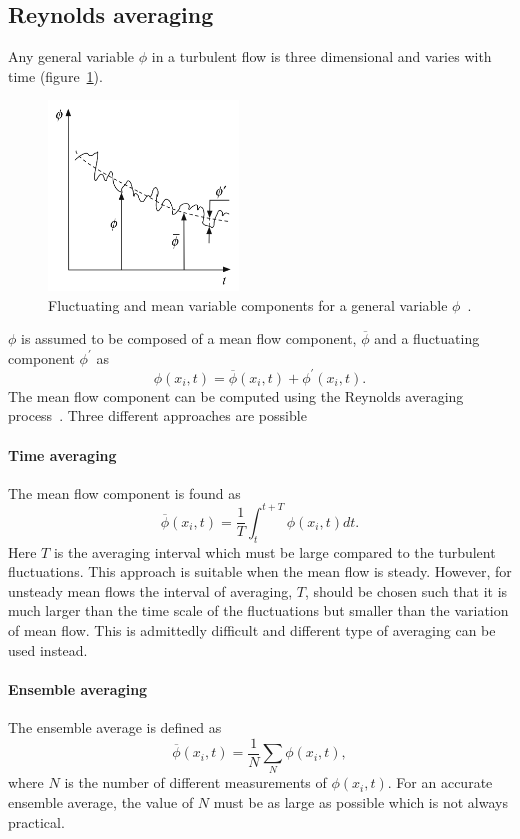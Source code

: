 \subsection{Reynolds averaging}\label{ssec:rans}
Any general variable $\phi$ in a turbulent flow is three dimensional and varies with time (figure~\ref{fig:ransfluct}). 
\begin{figure}[h]
\centering
\captionsetup{justification=centering}
 \includegraphics[width=0.45\textwidth]{ch2_litsurvey/Figures/RANSfluctphi.png}
\caption{Fluctuating and mean variable components for a general variable $\phi$~\cite{Moukalled}.}
 \label{fig:ransfluct}
\end{figure}
$\phi$ is assumed to be composed of a mean flow component, $\overline{\phi}$ and a fluctuating component $\phi^{\prime}$ as 
\begin{equation}
\phi(x_i,t) = \overline{\phi}(x_i,t) + \phi^{\prime}(x_i,t).
\end{equation}
The mean flow component can be computed using the Reynolds averaging process~\cite{Moukalled}. Three different approaches are possible
\paragraph{Time averaging}
The mean flow component is found as 
\begin{equation}
\overline{\phi}(x_i,t) = \frac{1}{T}\int_t^{t+T} \phi(x_i,t) dt.
\end{equation}
Here $T$ is the averaging interval which must be large compared to the turbulent fluctuations. This approach is suitable when the mean flow is steady. However, for unsteady mean flows the interval of averaging, $T$, should be chosen such that it is much larger than the time scale of the fluctuations but smaller than the variation of mean flow. This is admittedly difficult and different type of averaging can be used instead.
\paragraph{Ensemble averaging}
The ensemble average is defined as
\begin{equation}
\overline{\phi}(x_i,t) = \frac{1}{N}\sum_N \phi(x_i,t),
\end{equation}
where $N$ is the number of different measurements of $\phi(x_i,t)$. For an accurate ensemble average, the value of $N$ must be as large as possible which is not always practical.

